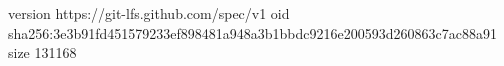 version https://git-lfs.github.com/spec/v1
oid sha256:3e3b91fd451579233ef898481a948a3b1bbdc9216e200593d260863c7ac88a91
size 131168
